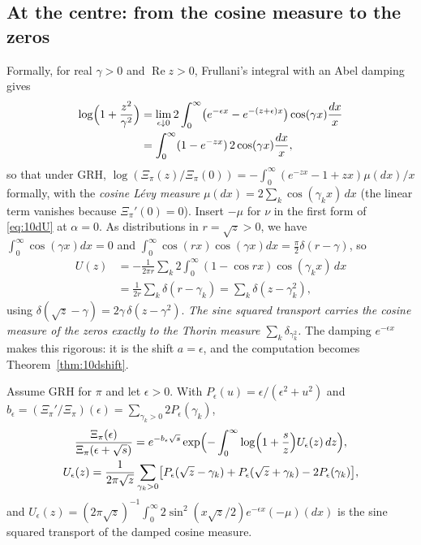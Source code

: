 \subsection{At the centre: from the cosine measure to the zeros}

Formally, for real $\gamma>0$ and $\operatorname{Re}z>0$, Frullani's integral with an Abel damping gives
\begin{align*}
\log\Bigl(1+\frac{z^2}{\gamma^2}\Bigr) &= \lim_{\epsilon\downarrow0}2\int_0^\infty\bigl(e^{-\epsilon x}-e^{-(z+\epsilon)x}\bigr)\cos(\gamma x)\frac{dx}x\\
&= \int_0^\infty(1-e^{-zx})\,2\cos(\gamma x)\frac{dx}x,
\end{align*}
so that under GRH, $\log(\Xi_\pi(z)/\Xi_\pi(0)) = -\int_0^\infty(e^{-zx}-1+zx)\mu(dx)/x$ formally, with the \emph{cosine L\'evy measure} $\mu(dx) = 2\sum_k\cos(\gamma_kx)\,dx$ (the linear term vanishes because $\Xi_\pi'(0) = 0$). Insert $-\mu$ for $\nu$ in the first form of \eqref{eq:10dU} at $\alpha = 0$. As distributions in $r = \sqrt z>0$, we have $\int_0^\infty\cos(\gamma x)dx = 0$ and $\int_0^\infty\cos(rx)\cos(\gamma x)dx = \frac\pi2\delta(r-\gamma)$, so
\begin{align*}
U(z) &= -\frac1{2\pi r}\sum_k2\int_0^\infty(1-\cos rx)\cos(\gamma_kx)\,dx\\
&= \frac1{2r}\sum_k\delta(r-\gamma_k) = \sum_k\delta(z-\gamma_k^2),
\end{align*}
using $\delta(\sqrt z-\gamma) = 2\gamma\,\delta(z-\gamma^2)$. \emph{The sine squared transport carries the cosine measure of the zeros exactly to the Thorin measure $\sum_k\delta_{\gamma_k^2}$.} The damping $e^{-\epsilon x}$ makes this rigorous: it is the shift $a = \epsilon$, and the computation becomes Theorem~\ref{thm:10dshift}.

\begin{proposition}\label{prop:10dsmooth}
Assume GRH for $\pi$ and let $\epsilon>0$. With $P_\epsilon(u) = \epsilon/(\epsilon^2+u^2)$ and $b_\epsilon = (\Xi_\pi'/\Xi_\pi)(\epsilon) = \sum_{\gamma_k>0}2P_\epsilon(\gamma_k)$,
\begin{gather*}
\frac{\Xi_\pi(\epsilon)}{\Xi_\pi(\epsilon+\sqrt s)} = e^{-b_\epsilon\sqrt s}\exp\Bigl(-\int_0^\infty\log\Bigl(1+\frac sz\Bigr)U_\epsilon(z)\,dz\Bigr),\\
U_\epsilon(z) = \frac1{2\pi\sqrt z}\sum_{\gamma_k>0}\bigl[P_\epsilon(\sqrt z-\gamma_k)+P_\epsilon(\sqrt z+\gamma_k)-2P_\epsilon(\gamma_k)\bigr],
\end{gather*}
and $U_\epsilon(z) = (2\pi\sqrt z)^{-1}\int_0^\infty2\sin^2(x\sqrt z/2)e^{-\epsilon x}(-\mu)(dx)$ is the sine squared transport of the damped cosine measure.
\end{proposition}

